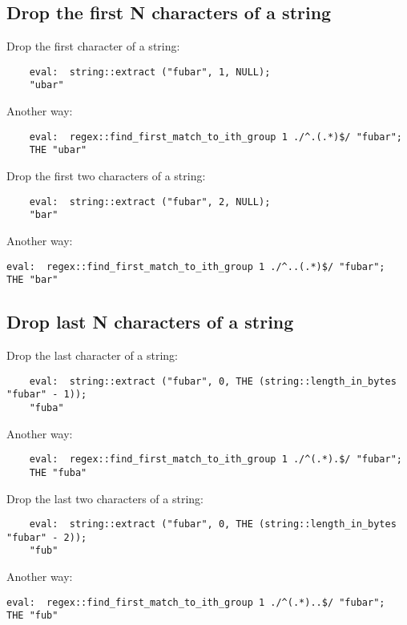 \cutend*

\subsection{Drop the first N characters of a string}

Drop the first character of a string:
\begin{verbatim}
    eval:  string::extract ("fubar", 1, NULL);
    "ubar"
\end{verbatim}

Another way:
\begin{verbatim}
    eval:  regex::find_first_match_to_ith_group 1 ./^.(.*)$/ "fubar";
    THE "ubar"
\end{verbatim}

Drop the first two characters of a string:
\begin{verbatim}
    eval:  string::extract ("fubar", 2, NULL);
    "bar"
\end{verbatim}

Another way:
\begin{verbatim}
eval:  regex::find_first_match_to_ith_group 1 ./^..(.*)$/ "fubar";
THE "bar"
\end{verbatim}
\cutend*

\subsection{Drop last N characters of a string}

Drop the last character of a string:
\begin{verbatim}
    eval:  string::extract ("fubar", 0, THE (string::length_in_bytes "fubar" - 1));
    "fuba"
\end{verbatim}

Another way:
\begin{verbatim}
    eval:  regex::find_first_match_to_ith_group 1 ./^(.*).$/ "fubar";
    THE "fuba"
\end{verbatim}

Drop the last two characters of a string:
\begin{verbatim}
    eval:  string::extract ("fubar", 0, THE (string::length_in_bytes "fubar" - 2));
    "fub"
\end{verbatim}

Another way:
\begin{verbatim}
eval:  regex::find_first_match_to_ith_group 1 ./^(.*)..$/ "fubar";
THE "fub"
\end{verbatim}

